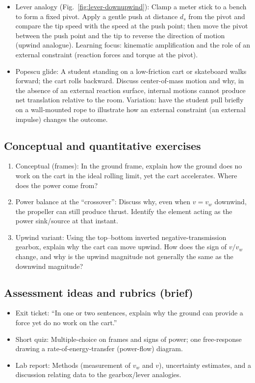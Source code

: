 \documentclass[a4paper]{article}
\begin{document}
\begin{itemize}
\item Lever analogy (Fig.~\ref{fig:lever-downupwind}): Clamp a meter stick to a bench to form a fixed pivot. Apply a gentle push at distance $d_s$ from the pivot and compare the tip speed with the speed at the push point; then move the pivot between the push point and the tip to reverse the direction of motion (upwind analogue). Learning focus: kinematic amplification and the role of an external constraint (reaction forces and torque at the pivot).
\item Popescu glide: A student standing on a low-friction cart or skateboard walks forward; the cart rolls backward. Discuss center-of-mass motion and why, in the absence of an external reaction surface, internal motions cannot produce net translation relative to the room. Variation: have the student pull briefly on a wall-mounted rope to illustrate how an external constraint (an external impulse) changes the outcome.
\end{itemize}

\subsection{Conceptual and quantitative exercises}

\begin{enumerate}
\item Conceptual (frames): In the ground frame, explain how the ground does no work on the cart in the ideal rolling limit, yet the cart accelerates. Where does the power come from?

\item Power balance at the ``crossover'': Discuss why, even when $v=v_w$ downwind, the propeller can still produce thrust. Identify the element acting as the power sink/source at that instant.

\item Upwind variant: Using the top--bottom inverted negative-transmission gearbox, explain why the cart can move upwind. How does the sign of $v/v_w$ change, and why is the upwind magnitude not generally the same as the downwind magnitude?
\end{enumerate}

\subsection{Assessment ideas and rubrics (brief)}

\begin{itemize}
\item Exit ticket: ``In one or two sentences, explain why the ground can provide a force yet do no work on the cart.''
\item Short quiz: Multiple-choice on frames and signs of power; one free-response drawing a rate-of-energy-transfer (power-flow) diagram.
\item Lab report: Methods (measurement of $v_w$ and $v$), uncertainty estimates, and a discussion relating data to the gearbox/lever analogies.
\end{itemize}
\end{document}
